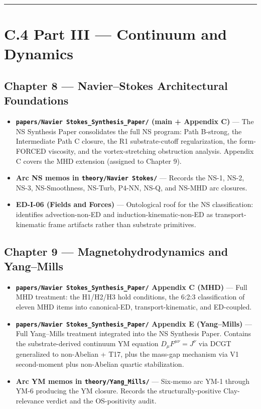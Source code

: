 \documentclass[11pt]{book}
\begin{document}
\bigskip\hrule\bigskip

\section{C.4 Part III — Continuum and Dynamics}

\subsection{Chapter 8 — Navier–Stokes Architectural Foundations}

\begin{itemize}
\item \textbf{\texttt{papers/Navier Stokes\_Synthesis\_Paper/} (main + Appendix C)} — The NS Synthesis Paper consolidates the full NS program: Path B-strong, the Intermediate Path C closure, the R1 substrate-cutoff regularization, the form-FORCED viscosity, and the vortex-stretching obstruction analysis. Appendix C covers the MHD extension (assigned to Chapter 9).
\item \textbf{Arc NS memos in \texttt{theory/Navier Stokes/}} — Records the NS-1, NS-2, NS-3, NS-Smoothness, NS-Turb, P4-NN, NS-Q, and NS-MHD arc closures.
\item \textbf{ED-I-06 (Fields and Forces)} — Ontological roof for the NS classification: identifies advection-non-ED and induction-kinematic-non-ED as transport-kinematic frame artifacts rather than substrate primitives.
\end{itemize}

\subsection{Chapter 9 — Magnetohydrodynamics and Yang–Mills}

\begin{itemize}
\item \textbf{\texttt{papers/Navier Stokes\_Synthesis\_Paper/} Appendix C (MHD)} — Full MHD treatment: the H1/H2/H3 hold conditions, the 6:2:3 classification of eleven MHD items into canonical-ED, transport-kinematic, and ED-coupled.
\item \textbf{\texttt{papers/Navier Stokes\_Synthesis\_Paper/} Appendix E (Yang–Mills)} — Full Yang–Mills treatment integrated into the NS Synthesis Paper. Contains the substrate-derived continuum YM equation $D_\mu F^{\mu\nu} = J^\nu$ via DCGT generalized to non-Abelian + T17, plus the mass-gap mechanism via V1 second-moment plus non-Abelian quartic stabilization.
\item \textbf{Arc YM memos in \texttt{theory/Yang\_Mills/}} — Six-memo arc YM-1 through YM-6 producing the YM closure. Records the structurally-positive Clay-relevance verdict and the OS-positivity audit.
\end{itemize}
\end{document}
